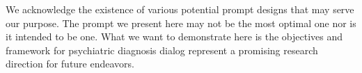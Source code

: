 We acknowledge the existence of various potential prompt designs that may serve our purpose. The prompt we present here may not be the most optimal one nor is it intended to be one. 
What we want to demonstrate here is the objectives and framework for psychiatric diagnosis dialog represent a promising research direction for future endeavors.




